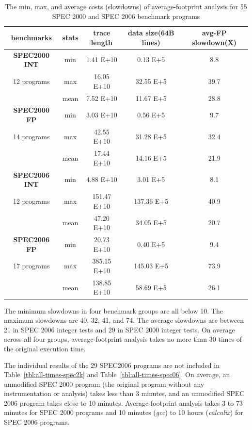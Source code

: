 \begin{table}[!h]
\centering
\small
\begin{tabular}{|c|c|c|c|c|}
\hline
benchmarks        &  stats     &trace length   &data size(64B lines)   &avg-FP slowdown(X) \\ \hline \hline
{\bf SPEC2000 INT}     & min   & 1.41 E+10     & 0.13 E+5      & 8.8 \\\cline{2-5}
    12  programs   & max   & 16.05 E+10    & 32.55 E+5     & 39.7 \\ \cline{2-5}
       & mean          & 7.52 E+10     & 11.67 E+5     & 28.8 \\ \hline \hline
{\bf SPEC2000 FP}      & min   & 3.03 E+10     & 0.56 E+5      & 9.7 \\ \cline{2-5}
    14   programs    & max   & 42.55 E+10    & 31.28 E+5     & 32.4 \\ \cline{2-5}
      & mean          & 17.44 E+10    & 14.16 E+5     & 21.9 \\ \hline \hline
{\bf SPEC2006 INT}     & min   & 4.88 E+10     & 3.01 E+5      & 8.1 \\ \cline{2-5}
     12  programs    & max   & 151.47 E+10   & 137.36 E+5    & 40.9 \\ \cline{2-5}
      & mean          & 47.20 E+10    & 34.05 E+5     & 20.7 \\ \hline \hline
{\bf SPEC2006 FP}      & min   & 20.73 E+10    & 0.40 E+5      & 9.4 \\ \cline{2-5}
      17   programs  & max   & 385.15 E+10   & 145.03 E+5    & 73.9 \\ \cline{2-5}
      & mean          & 138.85 E+10   & 58.69 E+5     & 26.1 \\ \hline
\end{tabular}
\caption{The min, max, and average costs (slowdowns) of average-footprint analysis for 55 SPEC 2000 and SPEC 2006 benchmark programs}
\label{tbl:aver-fp-speed}
\end{table}

The minimum slowdowns in four benchmark groups are all below 10.  The
maximum slowdowns are 40, 32, 41, and 74.  The average slowdowns are between
21 in SPEC 2006 integer tests and 29 in SPEC 2000 integer tests.  On
average across all four groups, average-footprint analysis takes no more
than 30 times of the original execution time.

The individual results of the 29 SPEC2006  programs are not included in 
Table~\ref{tbl:all-times-spec2k} and Table~\ref{tbl:all-times-spec06}.
On average, an unmodified SPEC 2000 program (the original
program without any instrumentation or analysis) takes less than
3 minutes, and an unmodified SPEC 2006 program takes close to 10 minutes.
Average-footprint analysis takes 3 to 73 minutes for SPEC 2000
programs and 10 minutes (\emph{gcc}) to 10 hours (\emph{calculix}) 
for SPEC 2006 programs.


